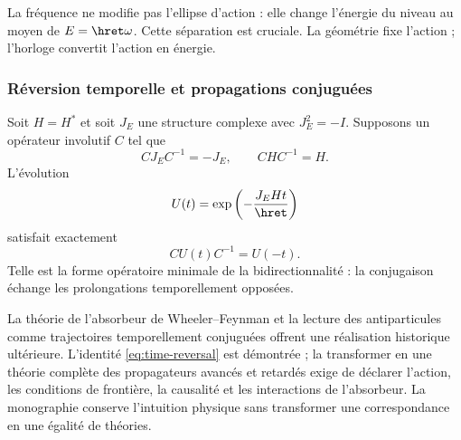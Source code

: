 La fréquence ne modifie pas l'ellipse d'action : elle change l'énergie du niveau
au moyen de \(E=\hret\omega\). Cette séparation est cruciale. La géométrie fixe
l'action ; l'horloge convertit l'action en énergie.

\subsubsection{Réversion temporelle et propagations conjuguées}

Soit \(H=H^*\) et soit \(J_E\) une structure complexe avec \(J_E^2=-I\).
Supposons un opérateur involutif \(C\) tel que
\[
CJ_EC^{-1}=-J_E,\qquad CHC^{-1}=H.
\]
L'évolution
\begin{equation}
U(t)=\exp\left(-\frac{J_EHt}{\hret}\right)
\label{eq:evolution-J}
\end{equation}
satisfait exactement
\begin{equation}
CU(t)C^{-1}=U(-t).
\label{eq:time-reversal}
\end{equation}
Telle est la forme opératoire minimale de la bidirectionnalité : la conjugaison
échange les prolongations temporellement opposées.

La théorie de l'absorbeur de Wheeler--Feynman et la lecture des antiparticules
comme trajectoires temporellement conjuguées offrent une réalisation historique
ultérieure. L'identité \eqref{eq:time-reversal} est démontrée ; la transformer
en une théorie complète des propagateurs avancés et retardés exige de déclarer
l'action, les conditions de frontière, la causalité et les interactions de l'absorbeur.
La monographie conserve l'intuition physique sans transformer une correspondance
en une égalité de théories.

